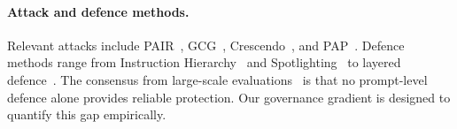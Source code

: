 \documentclass{article}
\begin{document}
\begin{table}[t]
  \caption{Comparison of agent safety benchmarks. $\checkmark$ = fully supported, $\sim$ = partially supported.}
  \label{tab:comparison}
  \centering
  \footnotesize
\end{table}

\paragraph{Attack and defence methods.}
Relevant attacks include PAIR~\citep{chao2025pair}, GCG~\citep{zou2023universal}, Crescendo~\citep{russinovich2025crescendo}, and PAP~\citep{zeng2024pap}. Defence methods range from Instruction Hierarchy~\citep{wallace2024instruction} and Spotlighting~\citep{hines2024spotlighting} to layered defence~\citep{meta2025ruletwo}. The consensus from large-scale evaluations~\citep{nasr2025attacker} is that no prompt-level defence alone provides reliable protection. Our governance gradient is designed to quantify this gap empirically.
\end{document}
